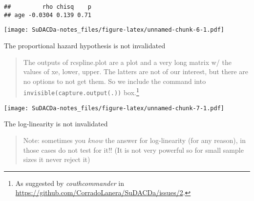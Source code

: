 \documentclass[]{book}
\newenvironment{Shaded}{\begin{snugshade}}{\end{snugshade}}
\newcommand{\KeywordTok}[1]{\textcolor[rgb]{0.13,0.29,0.53}{\textbf{{#1}}}}
\newcommand{\DataTypeTok}[1]{\textcolor[rgb]{0.13,0.29,0.53}{{#1}}}
\newcommand{\DecValTok}[1]{\textcolor[rgb]{0.00,0.00,0.81}{{#1}}}
\newcommand{\StringTok}[1]{\textcolor[rgb]{0.31,0.60,0.02}{{#1}}}
\newcommand{\CommentTok}[1]{\textcolor[rgb]{0.56,0.35,0.01}{\textit{{#1}}}}
\newcommand{\NormalTok}[1]{{#1}}
\let\rmarkdownfootnote\footnote%
\def\footnote{\protect\rmarkdownfootnote}
\theoremstyle{definition}
\theoremstyle{definition}
\theoremstyle{definition}
\theoremstyle{remark}
\begin{document}
\begin{verbatim}
##         rho chisq    p
## age -0.0304 0.139 0.71
\end{verbatim}

\begin{Shaded}
\end{Shaded}

\texttt{[image: SuDACDa-notes\_files/figure-latex/unnamed-chunk-6-1.pdf]}

The proportional hazard hypothesis is not invalidated

\begin{quote}
The outputs of rcspline.plot are a plot and a very long matrix w/ the
values of xe, lower, upper. The latters are not of our interest, but
there are no options to not get them. So we include the command into
\texttt{invisible(capture.output(.))} box.\footnote{As suggested by
  \emph{couthcommander} in
  \url{https://github.com/CorradoLanera/SuDACDa/issues/2}.}
\end{quote}

\begin{Shaded}
\end{Shaded}

\texttt{[image: SuDACDa-notes\_files/figure-latex/unnamed-chunk-7-1.pdf]}

The log-linearity is not invalidated

\begin{quote}
Note: sometimes you \emph{know} the answer for log-linearity (for any
reason), in those cases do not test for it!! (It is not very powerful so
for small sample sizes it never reject it)
\end{quote}
\end{document}
